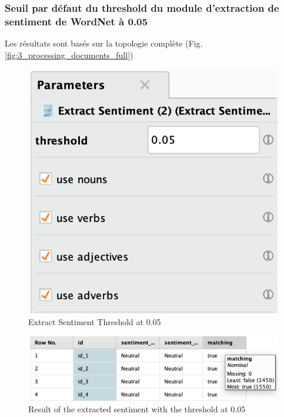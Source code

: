 \documentclass[a4paper]{article}
\begin{document}
\subsubsection{Seuil par défaut du threshold du module d'extraction de sentiment de WordNet à 0.05}
Les résultats sont basés sur la topologie complète (Fig.\ref{fig:3_processing_documents_full})
\begin{figure}[H]
\begin{center}
	\includegraphics[width=\linewidth/3]{imgs/part_3/3_processing_documents_full_0_05}
	\caption{Extract Sentiment Threshold at 0.05}
	\label{fig:3_processing_documents_full_0_05}
\end{center}
\end{figure}
\begin{figure}[H]

	\includegraphics[width=\linewidth]{imgs/part_3/3_processing_documents_full_0_05_results}
	\caption{Result of the extracted sentiment with the threshold at 0.05}
	\label{fig:3_processing_documents_full_0_05_results}
\end{figure}
\end{document}
